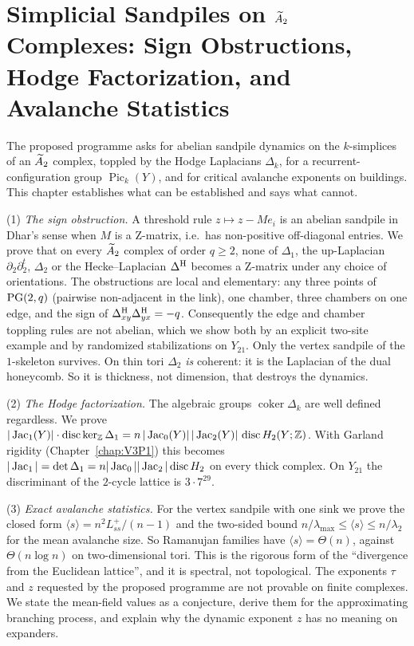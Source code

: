 \chapter{Simplicial Sandpiles on \texorpdfstring{$\widetilde A_2$}{A2} Complexes: Sign Obstructions, Hodge Factorization, and Avalanche Statistics}\label{chap:V3P2}
\begin{chapterabstract}
The proposed programme asks for abelian sandpile dynamics on the $k$-simplices of an $\widetilde A_2$
complex, toppled by the Hodge Laplacians $\Delta_k$, for a recurrent-configuration group
$\operatorname{Pic}_k(Y)$, and for critical avalanche exponents on buildings. This chapter
establishes what can be established and says what cannot.

(1) \emph{The sign obstruction.} A threshold rule $z\mapsto z-Me_i$ is an abelian sandpile in
Dhar's sense when $M$ is a Z-matrix, i.e.\ has non-positive off-diagonal entries. We prove
that on every $\widetilde A_2$ complex of order $q\ge2$, none of $\Delta_1$, the up-Laplacian
$\partial_2\partial_2^{t}$, $\Delta_2$ or the Hecke--Laplacian $\Delta^{\mathrm{H}}$ becomes a Z-matrix
under any choice of orientations. The obstructions are local and elementary: any three
points of $\mathrm{PG}(2,q)$ (pairwise non-adjacent in the link), one chamber, three chambers on one
edge, and the sign of
$\Delta^{\mathrm{H}}_{xy}\Delta^{\mathrm{H}}_{yx}=-q$. Consequently the edge and chamber toppling rules are not
abelian, which we show both by an explicit two-site example and by randomized
stabilizations on $Y_{21}$. Only the vertex sandpile of the $1$-skeleton survives. On thin
tori $\Delta_2$ \emph{is} coherent: it is the Laplacian of the dual honeycomb. So it is
thickness, not dimension, that destroys the dynamics.

(2) \emph{The Hodge factorization.} The algebraic groups $\operatorname{coker}\Delta_k$ are
well defined regardless. We prove
$|\operatorname{Jac}_1(Y)|\cdot\operatorname{disc}\ker_{\mathbb{Z}}\Delta_1=n\,|\operatorname{Jac}_0(Y)|\,|\operatorname{Jac}_2(Y)|\,
\operatorname{disc}H_2(Y;\mathbb{Z})$. With Garland rigidity (Chapter~\ref{chap:V3P1}) this becomes
$|\operatorname{Jac}_1|=\det\Delta_1=n|\operatorname{Jac}_0||\operatorname{Jac}_2|\operatorname{disc}H_2$ on every thick complex. On
$Y_{21}$ the discriminant of the $2$-cycle lattice is $3\cdot7^{29}$.

(3) \emph{Exact avalanche statistics.} For the vertex sandpile with one sink we prove the
closed form $\langle s\rangle=n^{2}L^{+}_{ss}/(n-1)$ and the two-sided bound
$n/\lambda_{\max}\le\langle s\rangle\le n/\lambda_2$ for the mean avalanche size. So Ramanujan
families have $\langle s\rangle=\Theta(n)$, against $\Theta(n\log n)$ on two-dimensional
tori. This is the rigorous form of the ``divergence from the Euclidean lattice'', and it is
spectral, not topological. The exponents $\tau$ and $z$ requested by the proposed programme are
not provable on finite complexes. We state the mean-field values as a conjecture, derive them
for the approximating branching process, and explain why the dynamic exponent $z$ has no
meaning on expanders.


\end{chapterabstract}
